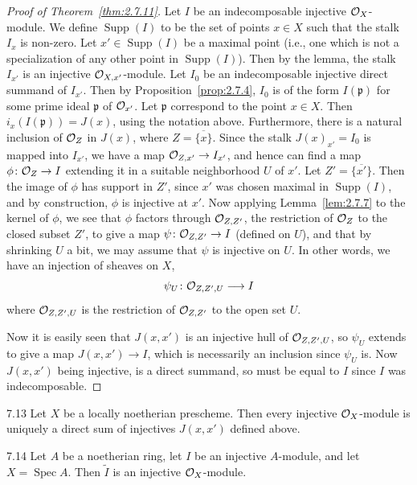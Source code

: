 \begin{proof}[Proof of Theorem~\ref{thm:2.7.11}]
Let $I$ be an indecomposable injective $\mathcal{O}_X$-module. We define $\operatorname{Supp}(I)$ to be the set of points $x\in X$ such that the stalk $I_x$ is non-zero. Let $x'\in\operatorname{Supp}(I)$ be a maximal point (i.e., one which is not a specialization of any other point in $\operatorname{Supp}(I)$). Then by the lemma, the stalk $I_{x'}$ is an injective $\mathcal{O}_{X,x'}$-module. Let $I_0$ be an indecomposable injective direct summand of $I_{x'}$. Then by Proposition~\ref{prop:2.7.4}, $I_0$ is of the form $I(\mathfrak{p})$ for some prime ideal $\mathfrak{p}$ of $\mathcal{O}_{x'}$. Let $\mathfrak{p}$ correspond to the point $x\in X$. Then $i_x(I(\mathfrak{p}))=J(x)$, using the notation above. Furthermore, there is a natural inclusion of $\mathcal{O}_Z$ in $J(x)$, where $Z=\overline{\{x\}}$. Since the stalk $J(x)_{x'}=I_0$ is mapped into $I_{x'}$, we have a map $\mathcal{O}_{Z,x'}\to I_{x'}$, and hence can find a map $\phi\colon\mathcal{O}_Z\to I$ extending it in a suitable neighborhood $U$ of $x'$. Let $Z'=\overline{\{x'\}}$. Then the image of $\phi$ has support in $Z'$, since $x'$ was chosen maximal in $\operatorname{Supp}(I)$, and by construction, $\phi$ is injective at $x'$. Now applying Lemma~\ref{lem:2.7.7} to the kernel of $\phi$, we see that $\phi$ factors through $\mathcal{O}_{Z,Z'}$, the restriction of $\mathcal{O}_Z$ to the closed subset $Z'$, to give a map $\psi\colon\mathcal{O}_{Z,Z'}\to I$ (defined on $U$), and that by shrinking $U$ a bit, we may assume that $\psi$ is injective on $U$. In other words, we have an injection of sheaves on $X$,
\[
\psi_U\colon \mathcal{O}_{Z,Z',U} \longrightarrow I
\]
where $\mathcal{O}_{Z,Z',U}$ is the restriction of $\mathcal{O}_{Z,Z'}$ to the open set $U$.

Now it is easily seen that $J(x,x')$ is an injective hull of $\mathcal{O}_{Z,Z',U}$, so $\psi_U$ extends to give a map $J(x,x')\to I$, which is necessarily an inclusion since $\psi_U$ is. Now $J(x,x')$ being injective, is a direct summand, so must be equal to $I$ since $I$ was indecomposable.
\end{proof}

\begin{bookcorollary}{7.13}\label{cor:2.7.13}
Let $X$ be a locally noetherian prescheme. Then every injective $\mathcal{O}_X$-module is uniquely a direct sum of injectives $J(x,x')$ defined above.
\end{bookcorollary}

\begin{bookcorollary}{7.14}\label{cor:2.7.14}
Let $A$ be a noetherian ring, let $I$ be an injective $A$-module, and let $X=\operatorname{Spec}A$. Then $\widetilde{I}$ is an injective $\mathcal{O}_X$-module.
\end{bookcorollary}

